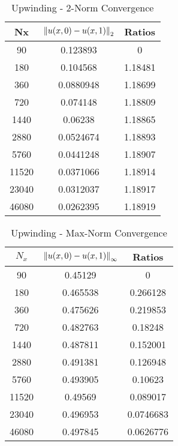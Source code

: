 \documentclass[12pt]{article}
\begin{document}
\begin{minipage}{0.5\textwidth}
\begin{table}[H]
\caption{Upwinding - 2-Norm Convergence}
\centering\begin{tabular}{||c|cc||}
\hline \hline
    Nx &   $\norm{u(x,0)-u(x,1)}_2$ &   Ratios \\
\hline
    90 &      0.123893  &  0       \\
   180 &      0.104568  &  1.18481 \\
   360 &      0.0880948 &  1.18699 \\
   720 &      0.074148  &  1.18809 \\
  1440 &      0.06238   &  1.18865 \\
  2880 &      0.0524674 &  1.18893 \\
  5760 &      0.0441248 &  1.18907 \\
 11520 &      0.0371066 &  1.18914 \\
 23040 &      0.0312037 &  1.18917 \\
 46080 &      0.0262395 &  1.18919 \\
\hline \hline
\end{tabular}
\end{table}
\end{minipage}
\begin{minipage}{0.5\textwidth}
\begin{table}[H]
\caption{Upwinding - Max-Norm Convergence}
\centering\begin{tabular}{||c|cc||}
\hline \hline
    $N_x$ & $\norm{u(x,0)-u(x,1)}_{\infty}$ &    Ratios \\
\hline
    90 &         0.45129  & 0         \\
   180 &         0.465538 & 0.266128  \\
   360 &         0.475626 & 0.219853  \\
   720 &         0.482763 & 0.18248   \\
  1440 &         0.487811 & 0.152001  \\
  2880 &         0.491381 & 0.126948  \\
  5760 &         0.493905 & 0.10623   \\
 11520 &         0.49569  & 0.089017  \\
 23040 &         0.496953 & 0.0746683 \\
 46080 &         0.497845 & 0.0626776 \\
\hline \hline
\end{tabular}
\end{table}
\end{minipage}%
\end{document}
